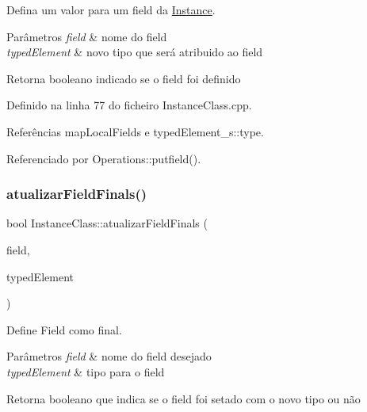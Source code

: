 Defina um valor para um field da \hyperlink{classInstance}{Instance}. 


\begin{DoxyParams}{Parâmetros}
{\em field} & nome do field \\
\hline
{\em typed\+Element} & novo tipo que será atribuido ao field \\
\hline
\end{DoxyParams}
\begin{DoxyReturn}{Retorna}
booleano indicado se o field foi definido 
\end{DoxyReturn}


Definido na linha 77 do ficheiro Instance\+Class.\+cpp.



Referências map\+Local\+Fields e typed\+Element\+\_\+s\+::type.



Referenciado por Operations\+::putfield().

\mbox{\label{classInstanceClass_a05a47d4bf656908ce3dacc53d9d791b2}} 
\subsubsection{\texorpdfstring{atualizar\+Field\+Finals()}{atualizarFieldFinals()}}
{\footnotesize\ttfamily bool Instance\+Class\+::atualizar\+Field\+Finals (\begin{DoxyParamCaption}\item[{string}]{field,  }\item[{\hyperlink{BasicTypes_8h_a97b332303b1262282599e6ede0637b82}{Typed\+Element}}]{typed\+Element }\end{DoxyParamCaption})}



Define Field como final. 


\begin{DoxyParams}{Parâmetros}
{\em field} & nome do field desejado \\
\hline
{\em typed\+Element} & tipo para o field \\
\hline
\end{DoxyParams}
\begin{DoxyReturn}{Retorna}
booleano que indica se o field foi setado com o novo tipo ou não 
\end{DoxyReturn}


